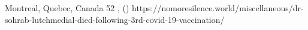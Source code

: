          {
            Montreal, Quebec, Canada
          }
          {
            52
          }
          {
          }
          {
            , 
          }
          {
             ()
          }
          {
            https://nomoresilence.world/miscellaneous/dr-sohrab-lutchmedial-died-following-3rd-covid-19-vaccination/
          }

